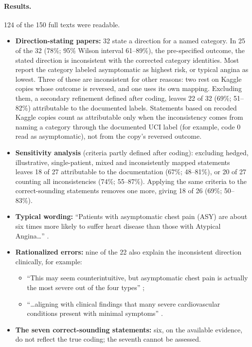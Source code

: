\documentclass[11pt]{article}
\begin{document}
\paragraph{Results.}
124 of the 150 full texts were readable.
\begin{itemize}
\item \textbf{Direction-stating papers:} 32 state a direction for a named category. In 25 of the 32 (78\%; 95\% Wilson interval \cite{wilson1927} 61--89\%), the pre-specified outcome, the stated direction is inconsistent with the corrected category identities. Most report the category labeled asymptomatic as highest risk, or typical angina as lowest. Three of these are inconsistent for other reasons: two rest on Kaggle copies whose outcome is reversed, and one uses its own mapping. Excluding them, a secondary refinement defined after coding, leaves 22 of 32 (69\%; 51--82\%) attributable to the documented labels. Statements based on recoded Kaggle copies count as attributable only when the inconsistency comes from naming a category through the documented UCI label (for example, code 0 read as asymptomatic), not from the copy's reversed outcome.
\item \textbf{Sensitivity analysis} (criteria partly defined after coding): excluding hedged, illustrative, single-patient, mixed and inconsistently mapped statements leaves 18 of 27 attributable to the documentation (67\%; 48--81\%), or 20 of 27 counting all inconsistencies (74\%; 55--87\%). Applying the same criteria to the correct-sounding statements removes one more, giving 18 of 26 (69\%; 50--83\%).
\item \textbf{Typical wording:} ``Patients with asymptomatic chest pain (ASY) are about six times more likely to suffer heart disease than those with Atypical Angina\ldots'' \cite{baghdadi2023}.
\item \textbf{Rationalized errors:} nine of the 22 also explain the inconsistent direction clinically, for example:
  \begin{itemize}
  \item ``This may seem counterintuitive, but asymptomatic chest pain is actually the most severe out of the four types'' \cite{dave2020};
  \item ``\ldots aligning with clinical findings that many severe cardiovascular conditions present with minimal symptoms'' \cite{harrou2025}.
  \end{itemize}
\item \textbf{The seven correct-sounding statements:} six, on the available evidence, do not reflect the true coding; the seventh cannot be assessed.

\end{itemize}
\end{document}
